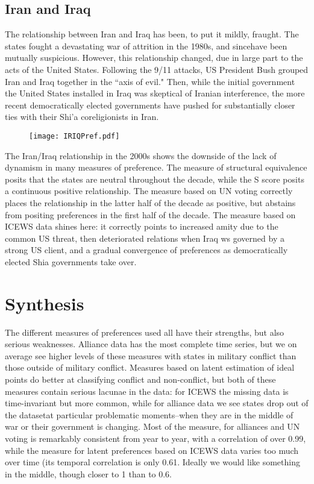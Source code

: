 \documentclass[12pt,onesided,fullpage]{amsart}
\begin{document}
\subsection{Iran and Iraq}

The relationship between Iran and Iraq has been, to put it mildly, fraught. The states fought a devastating war of attrition in the 1980s, and sincehave been mutually suspicious. However, this relationship changed, due in large part to the acts of the United States. Following the 9/11 attacks, US President Bush grouped Iran and Iraq together in the ``axis of evil." Then, while the initial government the United States installed in Iraq was skeptical of Iranian interference, the more recent democratically elected governments have pushed for substantially closer ties with their Shi'a coreligionists in Iran.

\begin{figure}
\texttt{[image: IRIQPref.pdf]}
\end{figure}

The Iran/Iraq relationship in the 2000s shows the downside of the lack of dynamism in many measures of preference. The measure of structural equivalence posits that the states are neutral throughout the decade, while the S score posits a continuous positive relationship. The measure based on UN voting correctly places the relationship in the latter half of the decade as positive, but abstains from positing preferences in the first half of the decade. The measure based on ICEWS data shines here: it correctly points to increased amity due to the common US threat, then deteriorated relations when Iraq ws governed by a strong US client, and a gradual convergence of preferences as democratically elected Shia governments take over.
\section{Synthesis}
The different measures of preferences used all have their strengths, but also serious weaknesses. Alliance data has the most complete time series, but we on average see higher levels of these measures with states in military conflict than those outside of military conflict. Measures based on latent estimation of ideal points do better at classifying conflict and non-conflict, but both of these measures contain serious lacunae in the data: for ICEWS the missing data is time-invariant but more common, while for alliance data we see states drop out of the datasetat particular problematic moments--when they are in the middle of war or their government is changing. Most of the measure, for alliances and UN voting is remarkably consistent from year to year, with a correlation of over 0.99, while the measure for latent preferences based on ICEWS data varies too much over time (its temporal correlation is only 0.61. Ideally we would like something in the middle, though closer to 1 than to 0.6.
\end{document}
